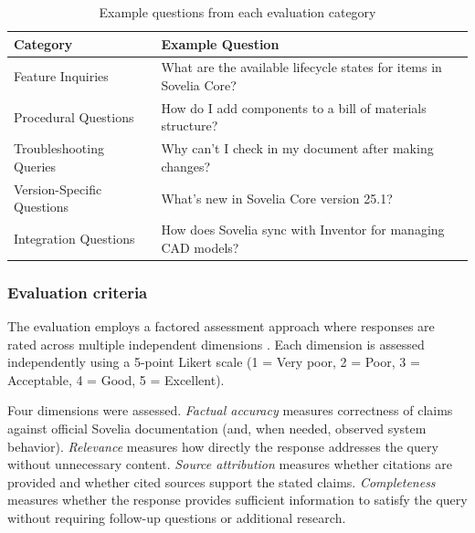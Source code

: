 \begin{table}[htbp]
    \centering
    \small
    \begin{tabular}{p{}p{}}
        \hline
        \textbf{Category}          & \textbf{Example Question}                                          \\
        \hline
        Feature Inquiries          & What are the available lifecycle states for items in Sovelia Core? \\
        \addlinespace
        Procedural Questions       & How do I add components to a bill of materials structure?          \\
        \addlinespace
        Troubleshooting Queries    & Why can't I check in my document after making changes?             \\
        \addlinespace
        Version-Specific Questions & What's new in Sovelia Core version 25.1?                           \\
        \addlinespace
        Integration Questions      & How does Sovelia sync with Inventor for managing CAD models?       \\
        \hline
    \end{tabular}
    \caption{Example questions from each evaluation category}
    \label{tab:example-questions}
\end{table}

\subsubsection{Evaluation criteria}

The evaluation employs a factored assessment approach where responses are rated across multiple independent dimensions \parencite{AbeysingheBhashithe2024TCoE}. Each dimension is assessed independently using a 5-point Likert scale (1 = Very poor, 2 = Poor, 3 = Acceptable, 4 = Good, 5 = Excellent).

Four dimensions were assessed. \textit{Factual accuracy} measures correctness of claims against official Sovelia documentation (and, when needed, observed system behavior). \textit{Relevance} measures how directly the response addresses the query without unnecessary content. \textit{Source attribution} measures whether citations are provided and whether cited sources support the stated claims. \textit{Completeness} measures whether the response provides sufficient information to satisfy the query without requiring follow-up questions or additional research.

